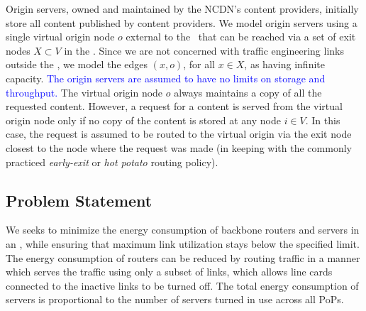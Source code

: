 Origin servers, owned and maintained by the NCDN's content providers, initially store all content published by content providers. We model origin servers using a single virtual origin node $o$ external to the \ncp\ that can be reached via a set of exit nodes $X \subset V$ in the \ncp.
Since we are not concerned with traffic engineering links outside the \ncp, we model the edges $(x, o)$, for all $x \in X$, as having infinite capacity. \textcolor{blue}{The origin servers are assumed to have no limits on storage and throughput.} The virtual origin node $o$  always maintains a copy of all the requested content. However, a request for a content is served from the virtual origin node only if no copy of the content is stored at any node $i \in V$. In this case, the request is assumed to be routed to the virtual origin  via the exit node closest to the node where the request was made (in keeping with the commonly practiced {\em early-exit} or {\em hot potato} routing policy).






\subsection{Problem Statement}

We seeks to minimize the energy consumption of backbone routers and servers in an \ncp, while ensuring that maximum link utilization stays below the specified limit.  The energy consumption of routers can be reduced by routing traffic in a manner which serves the traffic using only a subset of links, which allows line cards connected to the inactive links to be turned off. The total energy consumption of servers is proportional to the number of servers turned in use across all PoPs.




